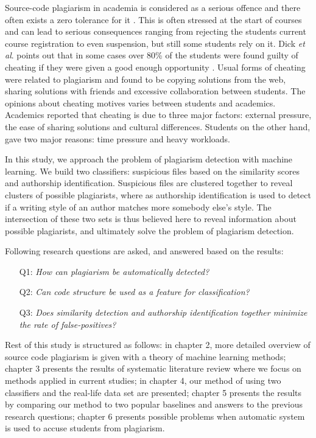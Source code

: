 \documentclass[english, grading]{tktltiki2}
\newcommand{\etal}{\textit{et al}. }
\theoremstyle{definition}
\theoremstyle{remark}
\numberwithin{equation}{section} %
\begin{document}
Source-code plagiarism in academia is considered as a serious offence and there often exists a zero tolerance for it \cite{TDSCP2008}. This is often stressed at the start of courses and can lead to serious consequences ranging from rejecting the students current course registration to even suspension, but still some students rely on it. Dick \etal points out that in some cases over 80\% of the students were found guilty of cheating if they were given a good enough opportunity \cite{Dick:2002:ASC:782941.783000}. Usual forms of cheating were related to plagiarism and found to be copying solutions from the web, sharing solutions with friends and excessive collaboration between students. The opinions about cheating motives varies between students and academics. Academics reported that cheating is due to three major factors: external pressure, the ease of sharing solutions and cultural differences. Students on the other hand, gave two major reasons: time pressure and heavy workloads.

In this study, we approach the problem of plagiarism detection with machine learning. We build two classifiers: suspicious files based on the similarity scores and authorship identification. Suspicious files are clustered together to reveal clusters of possible plagiarists, where as authorship identification is used to detect if a writing style of an author matches more somebody else's style. The intersection of these two sets is thus believed here to reveal information about possible plagiarists, and ultimately solve the problem of plagiarism detection. 

Following research questions are asked, and answered based on the results:

\begin{itemize}
    \item[Q1:] \emph{How can plagiarism be automatically detected?}
    \item[Q2:] \emph{Can code structure be used as a feature for classification?}
    \item[Q3:] \emph{Does similarity detection and authorship identification together minimize the rate of false-positives?}
\end{itemize}

Rest of this study is structured as follows: in chapter 2, more detailed overview of source code plagiarism is given with a theory of machine learning methods; chapter 3 presents the results of systematic literature review where we focus on methods applied in current studies; in chapter 4, our method of using two classifiers and the real-life data set are presented; chapter 5 presents the results by comparing our method to two popular baselines and answers to the previous research questions; chapter 6 presents possible problems when automatic system is used to accuse students from plagiarism. 
\end{document}
